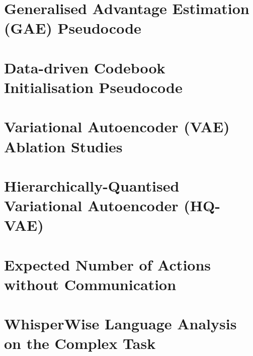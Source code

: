 \documentclass[12pt,a4paper,twoside,openright]{report}
\begin{document}


\newpage

\chapter{Generalised Advantage Estimation (GAE) Pseudocode}



\newpage

\chapter{Data-driven Codebook Initialisation Pseudocode}



\newpage

\chapter{Variational Autoencoder (VAE) Ablation Studies}



\newpage

\chapter{Hierarchically-Quantised Variational Autoencoder (HQ-VAE)}



\newpage


% 


\chapter{Expected Number of Actions without Communication}



\newpage

\chapter{WhisperWise Language Analysis on the Complex Task}
\end{document}

